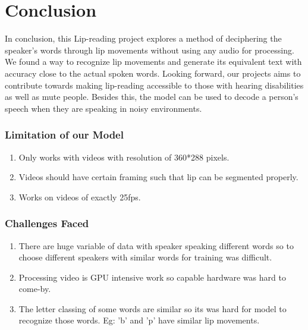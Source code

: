 	\chapter{Conclusion}

        In conclusion, this Lip-reading project explores a method of deciphering the speaker's words through lip movements without using any audio for processing. We found a way to recognize lip movements and generate its equivalent text with accuracy close to the actual spoken words. Looking forward, our projects aims to contribute towards making lip-reading accessible to those with hearing disabilities as well as mute people. Besides this, the model can be used to decode a person's speech when they are speaking in noisy environments.
        

\subsection*{Limitation of our Model}
\begin{enumerate}
    \item Only works with videos with resolution of 360*288 pixels.
    \item Videos should have certain framing such that lip can be segmented properly.
    \item Works on videos of exactly 25fps.

\end{enumerate}
\subsection*{Challenges Faced}
\begin{enumerate}
    \item  There are huge variable of data with speaker speaking different words so to choose different speakers with similar words for training was difficult.
    \item Processing video is GPU intensive work so capable hardware was hard to come-by.
    \item The letter classing of some words are similar so its was hard for model to recognize those words. Eg: 'b' and 'p' have similar lip movements.
\end{enumerate}